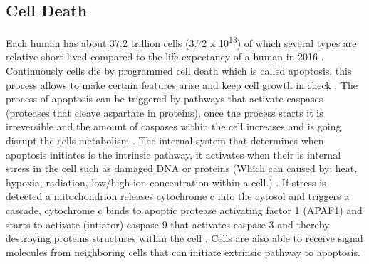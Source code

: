 \subsection{Cell Death}
Each human has about 37.2 trillion cells (3.72 x 10\textsuperscript{13}) \cite{} of which several types are relative short lived \cite{} compared to the life expectancy of a human in 2016 \cite{}. 
Continuously cells die by programmed cell death which is called apoptosis, this process allows to make certain features arise and keep cell growth in check \cite{}.
The process of apoptosis can be triggered by pathways that activate caspases (proteases that cleave aspartate in proteins), once the process starts it is irreversible and the amount of caspases within the cell increases and is going disrupt the cells metabolism \cite{}.
The internal system that determines when apoptosis initiates is the intrinsic pathway, it activates when their is internal stress in the cell such as damaged DNA or proteins (Which can caused by: heat, hypoxia, radiation, low/high ion concentration within a cell.)  \cite{}. 
If stress is detected a mitochondrion releases cytochrome c into the cytosol and triggers a cascade, cytochrome c binds to apoptic protease activating factor 1 (APAF1) and starts to activate (intiator) caspase 9 that activates caspase 3 and thereby destroying proteins structures within the cell \cite{}. 
Cells are also able to receive signal molecules from neighboring cells that can initiate extrinsic pathway to apoptosis. 


